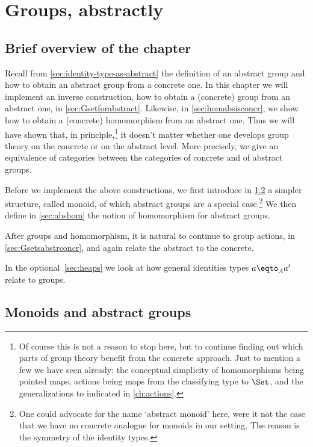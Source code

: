 \chapter{Groups, abstractly}
\label{ch:absgroup}

\section{Brief overview of the chapter}
Recall from \cref{sec:identity-type-as-abstract} the definition of an
abstract group and how to obtain an abstract group from a concrete one.
In this chapter we will
implement an inverse construction, how to obtain a (concrete) group from
an abstract one, in \cref{sec:Gsetforabstract}. Likewise, in \cref{sec:homabsisconcr},
we show how to obtain a (concrete) homomorphism from an abstract one.
Thus we will have shown that, in principle,\footnote{%
  Of course this is not a reason to stop here, but to continue
  finding out which parts of group theory benefit from the concrete approach.
  Just to mention a few we have seen already:
  the conceptual simplicity of homomorphisms being pointed maps,
  actions being maps from the classifying type to $\Set$,
and the generalizations to \inftygps indicated in \cref{ch:actions}.}
it doesn't matter whether
one develops group theory on the concrete or on the abstract level.
More precisely, we give an equivalence of categories between the 
categories of concrete and of abstract groups.

Before we implement the above constructions,
we first introduce in \cref{sec:monoids} a simpler structure, 
called monoid, of which abstract groups are a special case.\footnote{%
One could advocate for the name `abstract monoid' here, were it not the
case that we have no concrete analogue for monoids in our setting.
The reason is the symmetry of the identity types.}
We then define in \cref{sec:abshom} the notion of homomorphism for
abstract groups.

After groups and homomorphism, it is natural to continue to group actions,
in \cref{sec:Gsetsabstrconcr}, and again relate the abstract to the concrete.

 In the optional~\cref{sec:heaps} we look at how general
identities types $a \eqto_A a'$ relate to groups.

\section{Monoids and abstract groups}
\label{sec:monoids}

